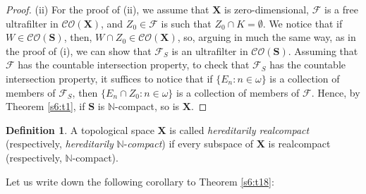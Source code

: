 \documentclass[12pt,twoside,leqno]{article}
\theoremstyle{plain}
\theoremstyle{definition}
\newtheorem{definition}[theorem]{Definition}
\theoremstyle{remark}
\begin{document}
\begin{proof}
	(ii) For the proof of (ii), we assume that $\mathbf{X}$ is zero-dimensional, $\mathcal{F}$ is a free ultrafilter in $\mathcal{CO}(\mathbf{X})$, and $Z_0\in\mathcal{F}$ is such that $Z_0\cap K=\emptyset$.  We notice that if $W\in\mathcal{CO}(\mathbf{S})$, then,  $W\cap Z_0\in \mathcal{CO}(\mathbf{X})$, so, arguing in much the same way, as in the proof of (i), we can show that $\mathcal{F}_S$ is an ultrafilter in $\mathcal{CO}(\mathbf{S})$. Assuming that $\mathcal{F}$ has the countable intersection property, to check that $\mathcal{F}_S$ has the countable intersection property, it suffices to notice that if $\{E_n: n\in\omega\}$ is a collection of members of $\mathcal{F}_S$, then $\{E_n\cap Z_0: n\in\omega\}$ is a collection of members of $\mathcal{F}$. Hence, by Theorem \ref{s6:t1}, if $\mathbf{S}$ is $\mathbb{N}$-compact, so is $\mathbf{X}$.  
\end{proof}

\begin{definition}
	\label{s6:d19}
	A topological space $\mathbf{X}$ is called \emph{hereditarily realcompact} (respectively, \emph{hereditarily} $\mathbb{N}$-\emph{compact}) if every subspace of $\mathbf{X}$ is realcompact (respectively, $\mathbb{N}$-compact).
\end{definition}

Let us write down the following corollary to Theorem \ref{s6:t18}:
\end{document}
